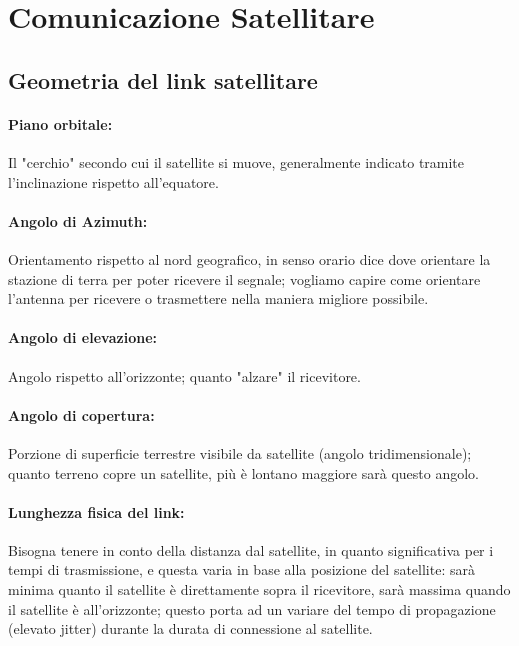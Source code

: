 \section{Comunicazione Satellitare}

\subsection{Geometria del link satellitare}

\paragraph{Piano orbitale:} Il "cerchio" secondo cui il satellite si muove, generalmente indicato tramite l'inclinazione rispetto all'equatore.

\paragraph{Angolo di Azimuth:} Orientamento rispetto al nord geografico, in senso orario dice dove orientare la stazione di terra per poter ricevere il segnale; vogliamo capire come orientare l'antenna per ricevere o trasmettere nella maniera migliore possibile.

\paragraph{Angolo di elevazione:} Angolo rispetto all'orizzonte; quanto "alzare" il ricevitore.

\paragraph{Angolo di copertura:} Porzione di superficie terrestre visibile da satellite (angolo tridimensionale); quanto terreno copre un satellite, più è lontano maggiore sarà questo angolo.

\paragraph{Lunghezza fisica del link:} Bisogna tenere in conto della distanza dal satellite, in quanto significativa per i tempi di trasmissione, e questa varia in base alla posizione del satellite: sarà minima quanto il satellite è direttamente sopra il ricevitore, sarà massima quando il satellite è all'orizzonte; questo porta ad un variare del tempo di propagazione (elevato jitter) durante la durata di connessione al satellite. 

